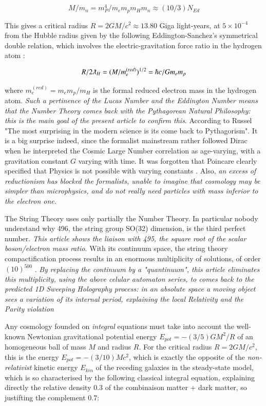 \documentclass[a4paper,9pt]{article}
\begin{document}
\begin{equation}\label{Eq2}
M/m_n = m_P^4/m_e m_p m_H m_n \approx (10/3)N_{Ed} 
 \end{equation}

This gives a critical radius $R = 2GM/c^2\approx 13.80$ Giga light-years, at $5 \times 10^{-4} $ from the Hubble radius given by the following Eddington-Sanchez's symmetrical double relation, which involves the electric-gravitation force ratio in the hydrogen atom \cite {Sanchez2}:

\begin{equation}\label{Eq2}
R/2\lambdabar_H = (M/m_e^{(red)})^{1/2} = \hbar c / G m_e m_p 
 \end{equation}

where $ m_e^{(red)} = m_e m_p/m_H$ is the formal reduced electron mass in the hydrogen atom. \textit {Such a pertinence of the Lucas Number and the Eddington Number means that the Number Theory comes back with the Pythagorean Natural Philosophy: this is the main goal of the present article to confirm this}. According to Russel "The most surprising in the modern science is its come back to Pythagorism"\cite{Alcina}. It is a big surprise indeed, since the formalist mainstream rather followed Dirac when he interpreted the Cosmic Large Number correlation as age-varying, with a gravitation constant $G$ varying with time. It was forgotten that Poincare clearly specified that Physics is not possible with varying constants \cite{Poincare2}. Also, \textit{an excess of reductionism has blocked the formalists, unable to imagine that cosmology may be simpler than microphysics, and do not really need particles with mass inferior to the electron one.}

The String Theory uses only partially the Number Theory. In particular nobody understand why 496, the string group SO(32) dimension, is the third perfect number. \textit {This article shows the liaison with 495, the square root of the scalar boson/electron mass ratio.} With its continuum space, the string theory compactification process results in an enormous multiplicity of solutions, of order $(10)^{500}$ \cite{Schwarz}. \textit {By replacing the continuum by a "quantinuum", this article eliminates this multiplicity, using the above celular automaton series, to comes back to the predicted 1D Sweeping Holography process: in an absolute space a moving object sees a variation of its internal period, explaining the local Relativity and the Parity violation \cite{Sanchez1} }     

Any cosmology founded on \textit{integral} equations must take into account the well-known Newtonian gravitational potential energy $ E_{pot} = -(3/5)GM^2/R$ of an homogeneous ball of mass $M$ and radius $R$. For the critical radius $R = 2GM/c^2$, this is the energy $ E_{pot} = -(3/10)Mc^2$, which is exactly the opposite of the \textit{non-relativist} kinetic energy $E_{kin}$ of the receding galaxies in the steady-state model, \cite {Sanchez2} which is so characterised by the following classical integral equation, explaining directly the relative density 0.3 of the combinaison matter + dark matter, so justifting the complement 0.7: 
% 
\end{document}
